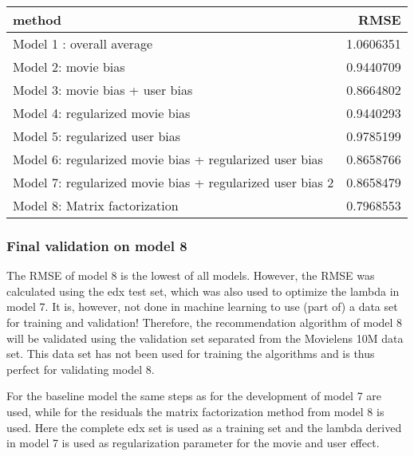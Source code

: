 \documentclass[
]{article}
\begin{document}
\begin{longtable}[]{@{}lr@{}}
\toprule
method & RMSE\tabularnewline
\midrule
\endhead
Model 1 : overall average & 1.0606351\tabularnewline
Model 2: movie bias & 0.9440709\tabularnewline
Model 3: movie bias + user bias & 0.8664802\tabularnewline
Model 4: regularized movie bias & 0.9440293\tabularnewline
Model 5: regularized user bias & 0.9785199\tabularnewline
Model 6: regularized movie bias + regularized user bias &
0.8658766\tabularnewline
Model 7: regularized movie bias + regularized user bias 2 &
0.8658479\tabularnewline
Model 8: Matrix factorization & 0.7968553\tabularnewline
\bottomrule
\end{longtable}

\hypertarget{final-validation-on-model-8}{%
\subsubsection{Final validation on model
8}\label{final-validation-on-model-8}}

The RMSE of model 8 is the lowest of all models. However, the RMSE was
calculated using the edx test set, which was also used to optimize the
lambda in model 7. It is, however, not done in machine learning to use
(part of) a data set for training and validation! Therefore, the
recommendation algorithm of model 8 will be validated using the
validation set separated from the Movielens 10M data set. This data set
has not been used for training the algorithms and is thus perfect for
validating model 8.

For the baseline model the same steps as for the development of model 7
are used, while for the residuals the matrix factorization method from
model 8 is used. Here the complete edx set is used as a training set and
the lambda derived in model 7 is used as regularization parameter for
the movie and user effect.
\end{document}
